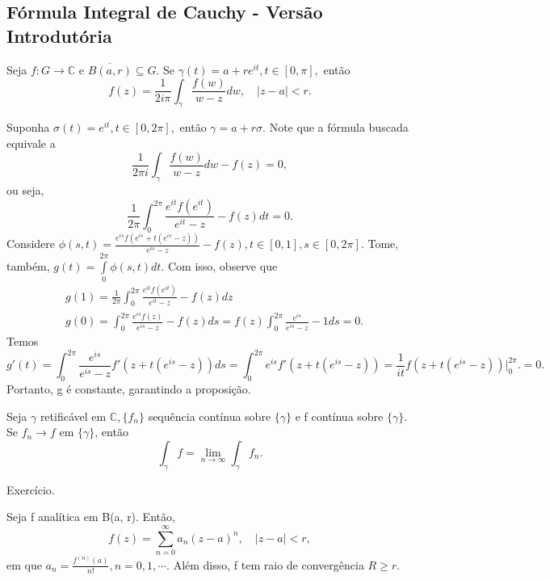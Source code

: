 \documentclass[complex.tex]{subfiles}
\begin{document}
\subsection{Fórmula Integral de Cauchy - Versão Introdutória}
\begin{prop*}
	Seja $f:G\rightarrow \mathbb{C}$ e $\overline{B(a, r)}\subseteq{G}.$ Se $\gamma(t) = a + r e^{it}, t\in[0, \pi],$ então
	$$
		f(z) = \frac{1}{2i\pi}\int_{\gamma}^{}\frac{f(w)}{w-z}dw, \quad |z-a| < r.
	$$
\end{prop*}
\begin{proof*}
	Suponha $\sigma(t) = e^{it}, t\in[0, 2\pi],$ então $\gamma = a + r\sigma.$ Note que a fórmula buscada equivale a
	$$
		\frac{1}{2\pi i}\int_{\gamma}^{}\frac{f(w)}{w-z}dw - f(z) = 0,
	$$
	ou seja,
	$$
		\frac{1}{2\pi}\int_{0}^{2\pi}\frac{e^{it}f(e^{it})}{e^{it}-z} - f(z) dt = 0.
	$$
	Considere $\phi(s, t) = \frac{e^{is}f(e^{is}+t(e^{is}-z))}{e^{is}-z} - f(z), t\in[0, 1], s\in[0, 2\pi]$. Tome, também,
	$g(t) = \int\limits_{0}^{2\pi}\phi(s, t)dt$. Com isso, observe que
	\begin{align*}
		 & g(1) = \frac{1}{2\pi}\int_{0}^{2\pi}\frac{e^{it}f(e^{it})}{e^{it}-z} - f(z)dz                                       \\
		 & g(0) = \int_{0}^{2\pi}\frac{e^{is}f(z)}{e^{is}-z} - f(z) ds = f(z)\int_{0}^{2\pi}\frac{e^{is}}{e^{is}-z} - 1ds = 0.
	\end{align*}
	Temos
	$$
		g'(t) = \int_{0}^{2\pi}\frac{e^{is}}{e^{is}-z}f'(z + t(e^{is}-z))ds = \int_{0}^{2\pi}e^{is}f'(z + t(e^{is}-z)) =
		\frac{1}{it}f(z + t(e^{is}-z)) \biggl|_{0}^{2\pi}\biggr. = 0.
	$$
	Portanto, g é constante, garantindo a proposição. \qedsymbol
\end{proof*}
\begin{lmm*}
	Seja $\gamma$ retificável em $\mathbb{C},\{f_{n}\} $ sequência contínua sobre $\{\gamma\} $ e f contínua sobre
	$\{\gamma\}$. Se $f_{n}\to{f}$ em $\{\gamma\}$, então
	$$
		\int_{\gamma}^{}f = \lim_{n\to\infty}\int_{\gamma}^{}f_{n}.
	$$
\end{lmm*}
\begin{proof*}
	Exercício.
\end{proof*}
\begin{theorem*}
	Seja f analítica em B(a, r). Então,
	$$
		f(z) = \sum\limits_{n=0}^{\infty}a_{n}(z-a)^{n}, \quad |z-a| < r,
	$$
	em que $a_{n} = \frac{f^{(n)}(a)}{n!}, n = 0, 1, \cdots.$ Além disso, f tem raio de convergência $R\geq{r}.$
\end{theorem*}
\end{document}
